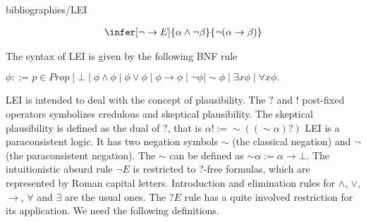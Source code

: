 \begin{entry}{bibliographies/LEI}
\begin{calculus}
\[\begin{array}{ccccccccccccccc}
  &
  \quad
  &
  
  
  \infer[\neg\to E]{\alpha \land \neg\beta}{\neg(\alpha \to \beta)}
  
  &
  \quad
  &
  
%  
%  
%  
  
  \end{array}
\]
\vspace{-1em}

\end{calculus}




\begin{clarifications}
  The syntax of LEI is given by the following BNF rule
  \begin{center} 
    \begin{math}
        \phi ::= p \in Prop \mid \bot \mid \phi \land \phi \mid \phi \lor \phi \mid \phi \rightarrow \phi \mid \neg \phi \mid \sim \phi \mid \exists x\phi \mid \forall x\phi.
    \end{math}
  \end{center}
  
  LEI is intended to deal with the concept of plausibility. The $?$ and $!$ post-fixed operators symbolizes credulous and skeptical plausibility. The skeptical plausibility is defined as the dual of $?$, that is $\alpha ! := \sim ((\sim \alpha)?)$ LEI is a paraconsistent logic. It has two negation symbols $\sim$ (the classical negation) and $\neg$ (the paraconsistent negation). The $\sim$ can be defined as $\sim \alpha := \alpha \to \bot$. The intuitionistic absurd rule $\neg E$ is restricted to $?$-free formulas, which are represented by Roman capital letters. Introduction and elimination rules for $\land$, $\lor$, $\to$, $\forall$ and $\exists$ are the usual ones. The $?E$ rule has a quite involved restriction for its application. We need the following definitions.
  

\end{clarifications}
\end{entry}
